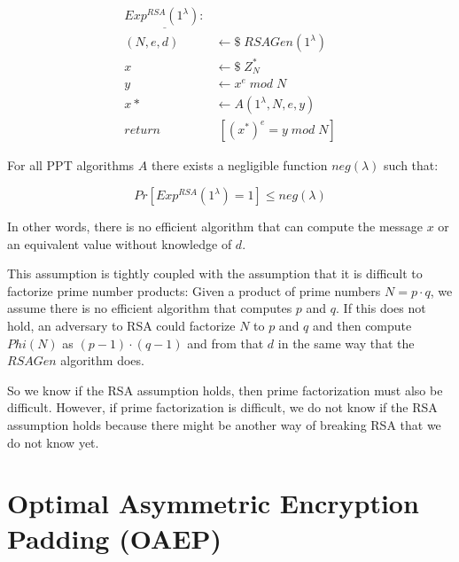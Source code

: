 \begin{align*}
    \underline{Exp^{RSA}(1^\lambda):} &                                  \\
    (N,e,d)                           & \leftarrow\$ \;RSAGen(1^\lambda) \\
    x                                 & \leftarrow\$ \;Z_N^*             \\
    y                                 & \leftarrow x^e \; mod \; N       \\
    x*                                & \leftarrow A(1^\lambda, N, e, y) \\
    return                            & \; [(x^*)^e = y \; mod \; N]
\end{align*}

For all PPT algorithms $A$ there exists a negligible function $neg(\lambda)$ such that:

$$
    Pr[Exp^{RSA}(1^\lambda) = 1] \leq neg(\lambda)
$$

In other words, there is no efficient algorithm that can compute the message $x$ or an equivalent value without knowledge of $d$.

This assumption is tightly coupled with the assumption that it is difficult to factorize prime number products:
Given a product of prime numbers $N = p \cdot q$, we assume there is no efficient algorithm that computes $p$ and $q$.
If this does not hold, an adversary to RSA could factorize $N$ to $p$ and $q$ and then compute $Phi(N)$ as $(p-1) \cdot (q-1)$ and from that $d$ in the same way that the $RSAGen$ algorithm does.

So we know if the RSA assumption holds, then prime factorization must also be difficult.
However, if prime factorization is difficult, we do not know if the RSA assumption holds because there might be another way of breaking RSA that we do not know yet.


\section{Optimal Asymmetric Encryption Padding (OAEP)}\label{sec:oaep}

